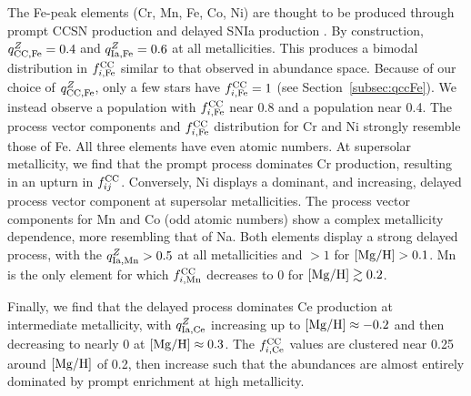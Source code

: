 \documentclass[modern]{aastex631}
\newcommand{\mgh}{[{\rm Mg}/{\rm H}]}
\newcommand{\qccFe}{q_{{\rm CC, Fe}}^{Z}}
\newcommand{\qIaFe}{q_{{\rm Ia,Fe}}^{Z}}
\newcommand{\fcc}{f_{ij}^{\rm CC}}
\newcommand{\qIaX}[1]{q_{{\rm Ia, #1}}^{Z}}
\newcommand{\fccX}[1]{f_{i, {\rm #1}}^{\rm CC}}
\begin{document}
The Fe-peak elements (Cr, Mn, Fe, Co, Ni) are thought to be produced through prompt CCSN production and delayed SNIa production \citep[e.g.][]{andrews2017}. By construction, $\qccFe=0.4$ and $\qIaFe=0.6$ at all metallicities. This produces a bimodal distribution in $\fccX{Fe}$ similar to that observed in abundance space. Because of our choice of $\qccFe$, only a few stars have $\fccX{Fe}=1$ (see Section~\ref{subsec:qccFe}). We instead observe a population with $\fccX{Fe}$ near 0.8 and a population near 0.4. The process vector components and $\fccX{Fe}$ distribution for Cr and Ni strongly resemble those of Fe. All three elements have even atomic numbers. At supersolar metallicity, we find that the prompt process dominates Cr production, resulting in an upturn in $\fcc$. Conversely, Ni displays a dominant, and increasing, delayed process vector component at supersolar metallicities. The process vector components for Mn and Co (odd atomic numbers) show a complex metallicity dependence, more resembling that of Na. Both elements display a strong delayed process, with the $\qIaX{Mn} > 0.5$ at all metallicities and $> 1$ for $\mgh > 0.1$. Mn is the only element for which $\fccX{Mn}$ decreases to 0 for $\mgh \gtrsim 0.2$. 

Finally, we find that the delayed process dominates Ce production at intermediate metallicity, with $\qIaX{Ce}$ increasing up to $\mgh \approx -0.2$ and then decreasing to nearly 0 at $\mgh \approx 0.3$. The $\fccX{Ce}$ values are clustered near 0.25 around $\mgh$ of 0.2, then increase such that the abundances are almost entirely dominated by prompt enrichment at high metallicity.
\end{document}
